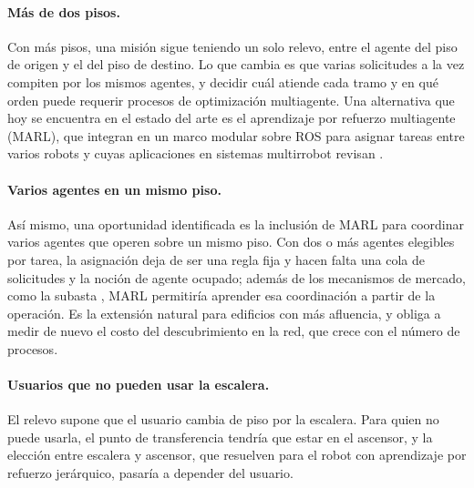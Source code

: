 \paragraph{Más de dos pisos.} Con más pisos, una misión sigue teniendo un solo
relevo, entre el agente del piso de origen y el del piso de destino. Lo que cambia es
que varias solicitudes a la vez compiten por los mismos agentes, y decidir cuál atiende
cada tramo y en qué orden puede requerir procesos de optimización multiagente. Una
alternativa que hoy se encuentra en el estado del arte es el
aprendizaje por refuerzo multiagente (MARL), que \textcite{xu2026modular} integran en
un marco modular sobre ROS para asignar tareas entre varios robots y cuyas
aplicaciones en sistemas multirrobot revisan \textcite{orr2023multiagent}.

\paragraph{Varios agentes en un mismo piso.} Así mismo, una oportunidad identificada
es la inclusión de MARL para coordinar varios agentes que operen sobre un mismo piso.
Con dos o más agentes elegibles por tarea, la asignación deja de ser una regla fija y
hacen falta una cola de solicitudes y la noción de agente ocupado; además de los
mecanismos de mercado, como la subasta \autocite{quinton2023market}, MARL permitiría
aprender esa coordinación a partir de la operación. Es la extensión natural para
edificios con más afluencia, y obliga a medir de nuevo el costo del descubrimiento en
la red, que crece con el número de procesos.

\paragraph{Usuarios que no pueden usar la escalera.} El relevo supone que el usuario
cambia de piso por la escalera. Para quien no puede usarla, el punto de transferencia
tendría que estar en el ascensor, y la elección entre escalera y ascensor, que
\textcite{luo2025elevator} resuelven para el robot con aprendizaje por refuerzo
jerárquico, pasaría a depender del usuario.
